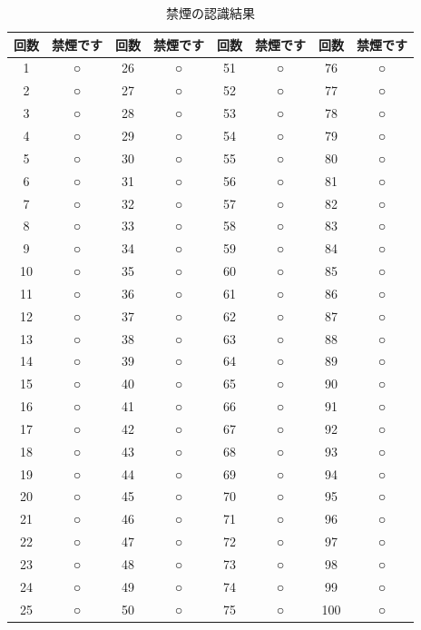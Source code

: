 \documentclass[12pt,oneside]{sotsuken_paper}
\begin{document}
\begin{table}[htb]
\begin{center}
\caption{禁煙の認識結果}
\begin{tabular}{|c|c|c|c|c|c|c|c|}\hline
回数&禁煙です&回数&禁煙です&回数&禁煙です&回数&禁煙です\\\hline
1&○&26&○&51&○&76&○\\\hline
2&○&27&○&52&○&77&○\\\hline
3&○&28&○&53&○&78&○\\\hline
4&○&29&○&54&○&79&○\\\hline
5&○&30&○&55&○&80&○\\\hline
6&○&31&○&56&○&81&○\\\hline
7&○&32&○&57&○&82&○\\\hline
8&○&33&○&58&○&83&○\\\hline
9&○&34&○&59&○&84&○\\\hline
10&○&35&○&60&○&85&○\\\hline
11&○&36&○&61&○&86&○\\\hline
12&○&37&○&62&○&87&○\\\hline
13&○&38&○&63&○&88&○\\\hline
14&○&39&○&64&○&89&○\\\hline
15&○&40&○&65&○&90&○\\\hline
16&○&41&○&66&○&91&○\\\hline
17&○&42&○&67&○&92&○\\\hline
18&○&43&○&68&○&93&○\\\hline
19&○&44&○&69&○&94&○\\\hline
20&○&45&○&70&○&95&○\\\hline
21&○&46&○&71&○&96&○\\\hline
22&○&47&○&72&○&97&○\\\hline
23&○&48&○&73&○&98&○\\\hline
24&○&49&○&74&○&99&○\\\hline
25&○&50&○&75&○&100&○
\\\hline
\end{tabular}
\label{tab:nosmokerecogresult}
\end{center}
\end{table}
\end{document}
